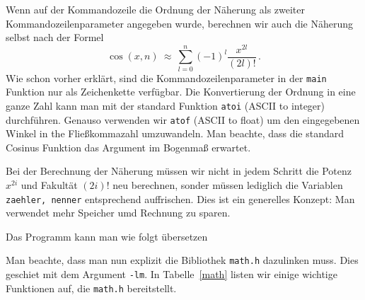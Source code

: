 Wenn auf der Kommandozeile die Ordnung der Näherung als zweiter Kommandozeilenparameter angegeben wurde, berechnen wir auch die Näherung selbst nach der Formel
\begin{equation}
  \cos\left(x,n\right)\ \approx\ \sum_{l=0}^{n} \left(-1\right)^{l} \dfrac{x^{2l}}{\left(2l\right)!}\,.
\end{equation}
Wie schon vorher erklärt, sind die Kommandozeilenparameter in der \texttt{main} Funktion nur als Zeichenkette verfügbar.
Die Konvertierung der Ordnung in eine ganze Zahl kann man mit der standard Funktion \texttt{atoi} (ASCII to integer) durchführen.
Genauso verwenden wir \texttt{atof} (ASCII to float) um den eingegebenen Winkel in the Fließkommazahl umzuwandeln.
Man beachte, dass die standard Cosinus Funktion das Argument im Bogenmaß erwartet.

Bei der Berechnung der Näherung müssen wir nicht in jedem Schritt die Potenz $x^{2i}$ und Fakultät $(2i)!$ neu berechnen, sonder müssen lediglich die Variablen \texttt{zaehler, nenner} entsprechend auffrischen.
Dies ist ein generelles Konzept: Man verwendet mehr Speicher umd Rechnung zu sparen.

Das Programm kann man wie folgt übersetzen

\vspace*{0.5cm}
\vspace*{0.5cm}

\noindent Man beachte, dass man nun explizit die Bibliothek \texttt{math.h} dazulinken muss.
Dies geschiet mit dem Argument \texttt{-lm}.
In Tabelle~\ref{math} listen wir einige wichtige Funktionen auf, die \texttt{math.h} bereitstellt.

